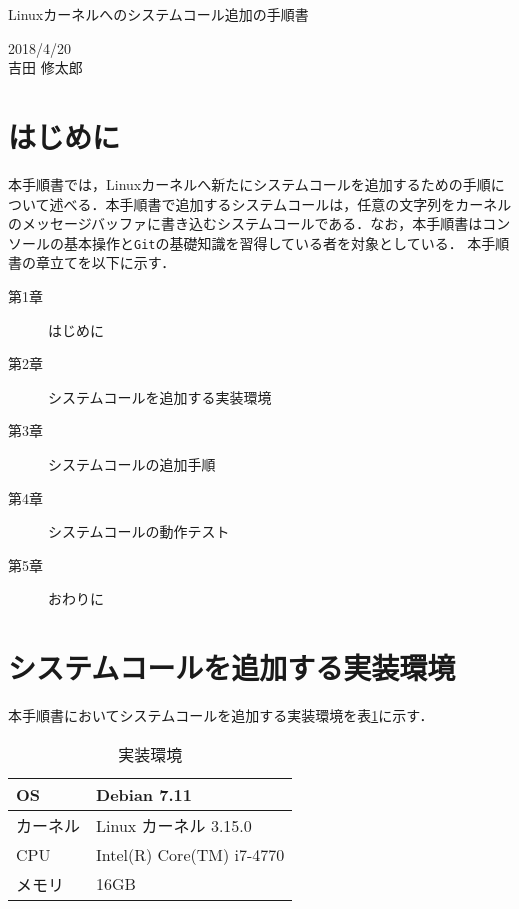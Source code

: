 \documentclass[12pt]{jsarticle}
\begin{document}
\begin{center}
  {\LARGE Linuxカーネルへのシステムコール追加の手順書}
\end{center}

\begin{flushright}
  2018/4/20\\
  吉田 修太郎
\end{flushright}
\section{はじめに}
本手順書では，Linuxカーネルへ新たにシステムコールを追加するための手順について述べる．本手順書で追加するシステムコールは，任意の文字列をカーネルのメッセージバッファに書き込むシステムコールである．なお，本手順書はコンソールの基本操作と\verb|Git|の基礎知識を習得している者を対象としている．
本手順書の章立てを以下に示す．
\begin{description}
\item[第1章] はじめに
\item[第2章] システムコールを追加する実装環境
\item[第3章] システムコールの追加手順
\item[第4章] システムコールの動作テスト
\item[第5章] おわりに
\end{description}
\section{システムコールを追加する実装環境}\label{sec2}
本手順書においてシステムコールを追加する実装環境を表\ref{table1}に示す．
\begin{table}[h!]
  \begin{center}
    \caption{実装環境}%
    \begin{tabular}{l|l}
      \hline\hline
      OS & Debian 7.11 \\
      \hline
      カーネル & Linux カーネル 3.15.0 \\
      \hline
      CPU & Intel(R) Core(TM) i7-4770 \\
      \hline
      メモリ & 16GB\\
      \hline
    \end{tabular}
    \label{table1}
  \end{center}
\end{table}
\end{document}
